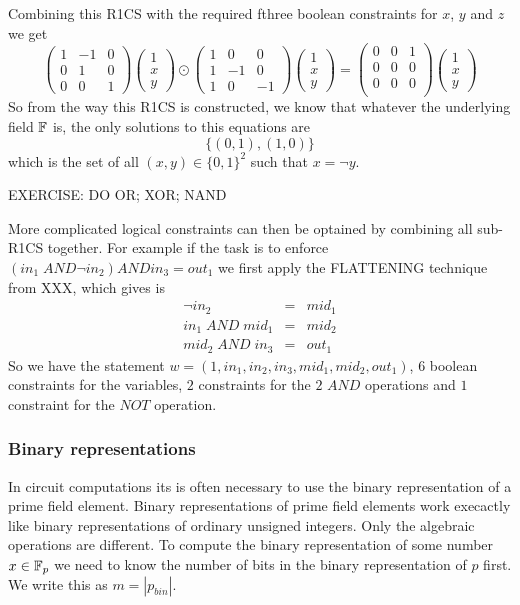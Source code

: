 Combining this R1CS with the required fthree boolean constraints for $x$, $y$ and $z$ we get
$$
\begin{pmatrix}
1 & -1 & 0 \\
\hline
0 & 1 & 0 \\
0 & 0 & 1
\end{pmatrix} \begin{pmatrix} 1 \\ x \\ y \end{pmatrix}\odot
\begin{pmatrix}
1 & 0 & 0 \\
\hline
1 & -1 & 0 \\
1 & 0  & -1 
\end{pmatrix} \begin{pmatrix} 1 \\ x \\ y \end{pmatrix} =
\begin{pmatrix}
0 & 0 & 1 \\
\hline
0 & 0 & 0 \\
0 & 0 & 0 \\
\end{pmatrix}\begin{pmatrix} 1 \\ x \\ y \end{pmatrix}
$$
So from the way this R1CS is constructed, we know that whatever the underlying field $\mathbb{F}$ is, the only solutions to this equations are
$$
\{(0,1), (1,0)\}
$$
which is the set of all $(x,y)\in\{0,1\}^2$ such that $x=\lnot y$.

EXERCISE: DO OR; XOR; NAND

More complicated logical constraints can then be optained by combining all sub-R1CS together. For example if the task is to enforce $(in_1\; AND \lnot in_2 ) AND in_3 = out_1$ we first apply the FLATTENING technique from XXX, which gives is
$$
\begin{array}{lcr}
\lnot in_2 &=& mid_1\\
in_1\; AND \; mid_1 &=& mid_2\\
mid_2 \; AND \; in_3 &=& out_1
\end{array}
$$
So we have the statement $w=(1,in_1,in_2,in_3, mid_1, mid_2,out_1)$, $6$ boolean constraints for the variables, $2$ constraints for the $2$ $AND$ operations and $1$ constraint for the $NOT$ operation.

\subsubsection{Binary representations}
In circuit computations its is often necessary to use the binary representation of a prime field element. Binary representations of prime field elements work execactly like binary representations of ordinary unsigned integers. Only the algebraic operations are different. To compute the binary representation of some number $x\in \mathbb{F}_p$ we need to know the number of bits in the binary representation of $p$ first. We write this as $m= |p_{bin}|$. 

